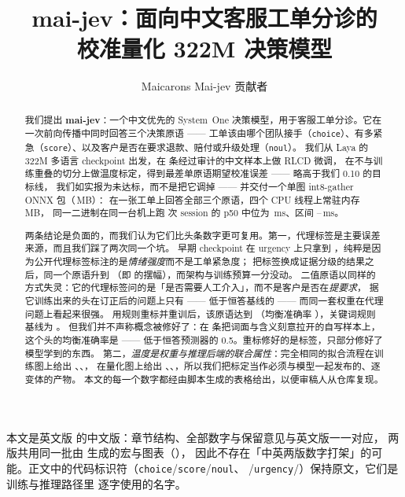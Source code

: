 \documentclass[11pt,a4paper]{article}
\title{\textbf{mai-jev}：面向中文客服工单分诊的\\校准量化 322M 决策模型}
\author{Maicarons Mai-jev 贡献者}
\date{}
\begin{document}
\maketitle

本文是英文版  的中文版：章节结构、全部数字与保留意见与英文版一一对应，
两版共用同一批由  生成的宏与图表（），
因此不存在「中英两版数字打架」的可能。正文中的代码标识符（\texttt{choice}/\texttt{score}/\texttt{noul}、
/\texttt{urgency}/）保持原文，它们是训练与推理路径里
逐字使用的名字。

\begin{abstract}
我们提出 \textbf{mai-jev}：一个中文优先的 System~One 决策模型，用于客服工单分诊。它在一次前向传播中同时回答三个决策原语 ——
工单该由哪个团队接手（\texttt{choice}）、有多紧急（\texttt{score}）、以及客户是否在要求退款、赔付或升级处理（\texttt{noul}）。
我们从 Laya 的 322M 多语言 checkpoint 出发，在 \DataTotalRows{} 条经过审计的中文样本上做 RLCD 微调，
在不与训练重叠的切分上做温度标定，得到最差单原语期望校准误差 \WorstEce{} —— 略高于我们 \num{0.10} 的目标线，
我们如实报为未达标，而不是把它调掉 —— 并交付一个单图 int8-gather ONNX 包（\ModelMb\,MB）：
在一张工单上回答全部三个原语，四个 CPU 线程上常驻内存 \RssMb\,MB，
同一二进制在同一台机上跑 \LatSessions{} 次 session 的 p50 中位为 \LatPFiveZeroMedian\,ms、区间 \LatPFiveZeroBest--\LatPFiveZeroWorst\,ms。

两条结论是负面的，而我们认为它们比头条数字更可复用。第一，代理标签是主要误差来源，而且我们踩了两次同一个坑。
早期 checkpoint 在 urgency 上只拿到 \AccScoreVZeroTwo{}，纯粹是因为公开代理标签标注的是\emph{情绪强度}而不是工单紧急度；
把标签换成证据分级的结果之后，同一个原语升到 \AccScore{}（即 \DeltaUrg{} 的摆幅），而架构与训练预算一分没动。
二值原语以同样的方式失灵：它的代理标签问的是「是否需要人工介入」，而不是客户是否在\emph{提要求}，
据它训练出来的头在订正后的问题上只有 \OldHeadAccNoul{} —— 低于恒答基线的 \MajAccNoul{} —— 而同一套权重在代理问题上看起来很强。
用规则重标并重训后，该原语达到 \AccNoul{}（均衡准确率 \BAccNoul{}），关键词规则基线为 \RulesBAccNoul{}。
但我们并不声称概念被修好了：在 \AntibodyN{} 条把词面与含义刻意拉开的自写样本上，这个头的均衡准确率是 \AntibodyBAcc{} ——
低于恒答预测器的 \num{0.5}。重标修好的是标签，只部分修好了模型学到的东西。
第二，\emph{温度是权重与推理后端的联合属性}：完全相同的拟合流程在训练图上给出 \TChoice{}、\TScore{}、\TNoul{}，
在量化图上给出 \TChoiceOnnx{}、\TScoreOnnx{}、\TNoulOnnx{}，所以我们把标定当作必须与模型一起发布的、逐变体的产物。
本文的每一个数字都经由脚本生成的表格给出，以便审稿人从仓库复现。
\end{abstract}
\end{document}
